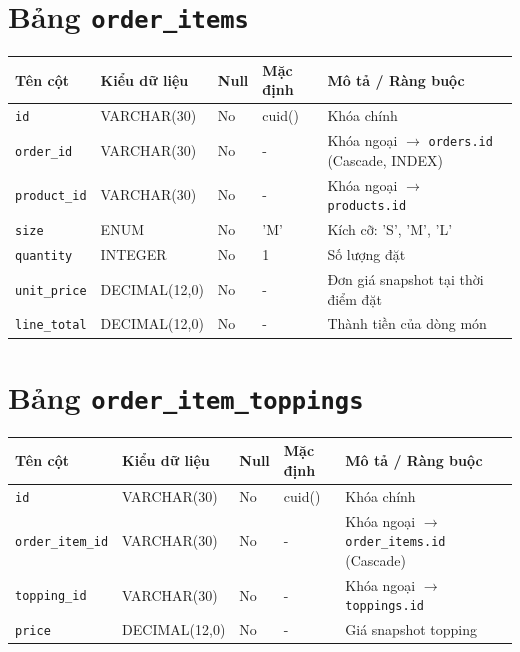 \documentclass[12pt,a4paper,oneside]{report}
\begin{document}
\section{Bảng \texttt{order\_items}}
\begin{table}[H]
\centering
\small
\begin{tabularx}{\textwidth}{llllX}
\toprule
\textbf{Tên cột} & \textbf{Kiểu dữ liệu} & \textbf{Null} & \textbf{Mặc định} & \textbf{Mô tả / Ràng buộc} \\
\midrule
\texttt{id} & VARCHAR(30) & No & cuid() & Khóa chính \\
\texttt{order\_id} & VARCHAR(30) & No & - & Khóa ngoại \(\to\) \texttt{orders.id} (Cascade, INDEX) \\
\texttt{product\_id} & VARCHAR(30) & No & - & Khóa ngoại \(\to\) \texttt{products.id} \\
\texttt{size} & ENUM & No & 'M' & Kích cỡ: 'S', 'M', 'L' \\
\texttt{quantity} & INTEGER & No & 1 & Số lượng đặt \\
\texttt{unit\_price} & DECIMAL(12,0) & No & - & Đơn giá snapshot tại thời điểm đặt \\
\texttt{line\_total} & DECIMAL(12,0) & No & - & Thành tiền của dòng món \\
\bottomrule
\end{tabularx}
\end{table}

\section{Bảng \texttt{order\_item\_toppings}}
\begin{table}[H]
\centering
\small
\begin{tabularx}{\textwidth}{llllX}
\toprule
\textbf{Tên cột} & \textbf{Kiểu dữ liệu} & \textbf{Null} & \textbf{Mặc định} & \textbf{Mô tả / Ràng buộc} \\
\midrule
\texttt{id} & VARCHAR(30) & No & cuid() & Khóa chính \\
\texttt{order\_item\_id} & VARCHAR(30) & No & - & Khóa ngoại \(\to\) \texttt{order\_items.id} (Cascade) \\
\texttt{topping\_id} & VARCHAR(30) & No & - & Khóa ngoại \(\to\) \texttt{toppings.id} \\
\texttt{price} & DECIMAL(12,0) & No & - & Giá snapshot topping \\
\bottomrule
\end{tabularx}
\end{table}
\end{document}
